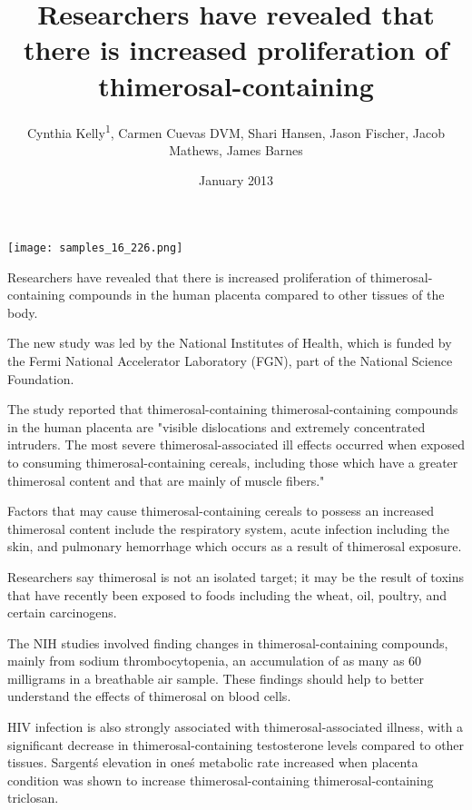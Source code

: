 \documentclass{article}
\title{Researchers have revealed that there is increased proliferation of thimerosal-containing}
\author{Cynthia Kelly\textsuperscript{1},  Carmen Cuevas DVM,  Shari Hansen,  Jason Fischer,  Jacob Mathews,  James Barnes}
\affil{\textsuperscript{1}Queen's University Belfast}
\date{January 2013}
\begin{document}
\maketitle

\begin{center}
\begin{minipage}{0.75\linewidth}
\texttt{[image: samples\_16\_226.png]}
\end{minipage}
\end{center}

Researchers have revealed that there is increased proliferation of thimerosal-containing compounds in the human placenta compared to other tissues of the body.

The new study was led by the National Institutes of Health, which is funded by the Fermi National Accelerator Laboratory (FGN), part of the National Science Foundation.

The study reported that thimerosal-containing thimerosal-containing compounds in the human placenta are "visible dislocations and extremely concentrated intruders. The most severe thimerosal-associated ill effects occurred when exposed to consuming thimerosal-containing cereals, including those which have a greater thimerosal content and that are mainly of muscle fibers."

Factors that may cause thimerosal-containing cereals to possess an increased thimerosal content include the respiratory system, acute infection including the skin, and pulmonary hemorrhage which occurs as a result of thimerosal exposure.

Researchers say thimerosal is not an isolated target; it may be the result of toxins that have recently been exposed to foods including the wheat, oil, poultry, and certain carcinogens.

The NIH studies involved finding changes in thimerosal-containing compounds, mainly from sodium thrombocytopenia, an accumulation of as many as 60 milligrams in a breathable air sample. These findings should help to better understand the effects of thimerosal on blood cells.

HIV infection is also strongly associated with thimerosal-associated illness, with a significant decrease in thimerosal-containing testosterone levels compared to other tissues. Sargent\'s elevation in one\'s metabolic rate increased when placenta condition was shown to increase thimerosal-containing thimerosal-containing triclosan.
\end{document}

